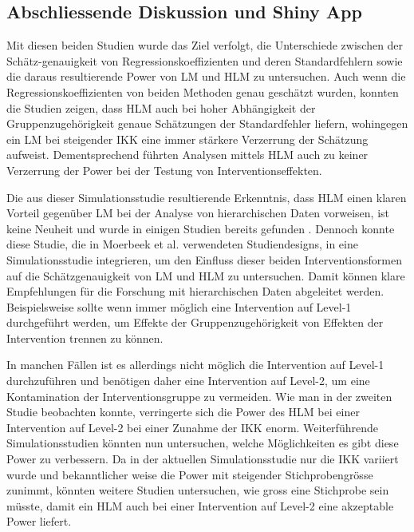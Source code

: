 \documentclass[12pt]{article}\usepackage[]{graphicx}\usepackage[]{color}
\begin{document}
\subsection{Abschliessende Diskussion und Shiny App}
Mit diesen beiden Studien wurde das Ziel verfolgt, die Unterschiede zwischen der Schätz-genauigkeit von Regressionskoeffizienten und deren Standardfehlern sowie die daraus resultierende Power von LM und HLM zu untersuchen. Auch wenn die Regressionskoeffizienten von beiden Methoden genau geschätzt wurden, konnten die Studien zeigen, dass HLM auch bei hoher Abhängigkeit der Gruppenzugehörigkeit genaue Schätzungen der Standardfehler liefern, wohingegen ein LM bei steigender IKK eine immer stärkere Verzerrung der Schätzung aufweist. Dementsprechend führten Analysen mittels HLM auch zu keiner Verzerrung der Power bei der Testung von Interventionseffekten.

Die aus dieser Simulationsstudie resultierende Erkenntnis, dass HLM einen klaren Vorteil gegenüber LM bei der Analyse von hierarchischen Daten vorweisen, ist keine Neuheit und wurde in einigen Studien bereits gefunden \citep{mcneish2014analyzing, MOERBEEK2003341, mundfrom2002monte, osborne2000advantages}. Dennoch konnte diese Studie, die in Moerbeek et al. \citeyearpar{MOERBEEK2003341} verwendeten Studiendesigns, in eine Simulationsstudie integrieren, um den Einfluss dieser beiden Interventionsformen auf die Schätzgenauigkeit von LM und HLM zu untersuchen. Damit können klare Empfehlungen für die Forschung mit hierarchischen Daten abgeleitet werden. Beispielsweise sollte wenn immer möglich eine Intervention auf Level-1 durchgeführt werden, um Effekte der Gruppenzugehörigkeit von Effekten der Intervention trennen zu können. 

In manchen Fällen ist es allerdings nicht möglich die Intervention auf Level-1 durchzuführen und benötigen daher eine Intervention auf Level-2, um eine Kontamination der Interventionsgruppe zu vermeiden. Wie man in der zweiten Studie beobachten konnte, verringerte sich die Power des HLM bei einer Intervention auf Level-2 bei einer Zunahme der IKK enorm. Weiterführende Simulationsstudien könnten nun untersuchen, welche Möglichkeiten es gibt diese Power zu verbessern. Da in der aktuellen Simulationsstudie nur die IKK variiert wurde und bekanntlicher weise die Power mit steigender Stichprobengrösse zunimmt, könnten weitere Studien untersuchen, wie gross eine Stichprobe sein müsste, damit ein HLM auch bei einer Intervention auf Level-2 eine akzeptable Power liefert. 
\end{document}
